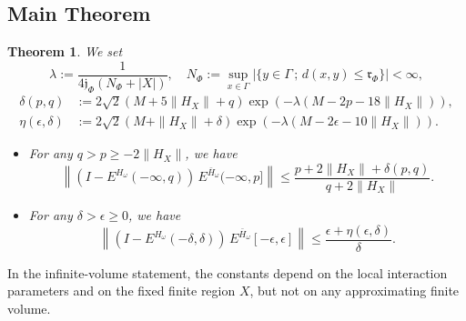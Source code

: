 \documentclass[11pt]{article}
\numberwithin{equation}{section}
\newtheorem{theorem}{Theorem}[section]
\begin{document}
\subsection{Main Theorem}
\begin{theorem}\label{thm_main_infinite}
We set
\[
\lambda:=\frac{1}{4\mathfrak{j}_\Phi(N_\Phi+|X|)}, \quad N_\Phi:=\sup_{x\in\Gamma} |\{ y\in\Gamma \,;\, d(x,y)\leq \mathfrak{r}_\Phi\}|<\infty,
\]
\begin{align*}
\delta(p,q)&:=2\sqrt{2}(M+5\|H_X\|+q) \exp(-\lambda(M-2p-18\|H_X\|)),\\
\eta(\epsilon,\delta)&:=2\sqrt{2}(M+\|H_X\|+\delta) \exp(-\lambda(M-2\epsilon-10\|H_X\|)).
\end{align*}
\begin{itemize}
\item[(i)] For any $q>p\geq-2\|H_X\|$, we have
\[
\left\|\left(I-E^{H_\omega}(-\infty,q)\right)\,
E^{\bar{H}_\omega}(-\infty,p]\right\|
\leq\frac{p+2\|H_X\|+\delta(p,q)}{q+2\|H_X\|}.
\]
\item[(ii)] For any $\delta>\epsilon\geq0$, we have
\[
\left\|\left(I-E^{H_\omega}(-\delta,\delta)\right)\,
E^{\bar{H}_\omega}[-\epsilon,\epsilon]\right\|
\leq\frac{\epsilon+\eta(\epsilon,\delta)}{\delta}.
\]
\end{itemize}
\end{theorem}

In the infinite-volume statement, the constants depend on the local interaction parameters and on the fixed finite region $X$, but not on any approximating finite volume.
\end{document}
